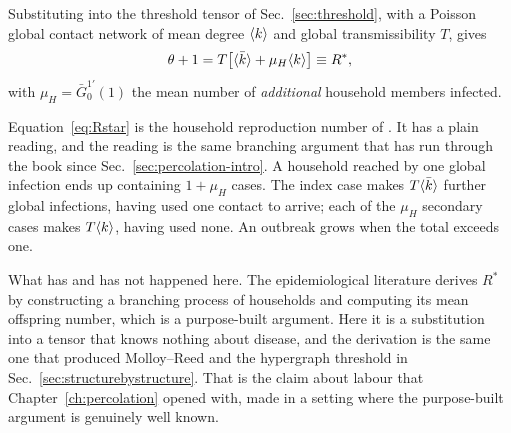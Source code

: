 Substituting into the threshold tensor of Sec.~\ref{sec:threshold}, with a
Poisson global contact network of mean degree $\langle k \rangle$ and global
transmissibility $T$, gives
\begin{equation}
  \theta+1=T\bigl[\langle \bar k \rangle+\mu_{H}\langle k \rangle\bigr]\equiv R^{\ast},
  \label{eq:Rstar}
\end{equation}
with $\mu_{H}=\bar G^{1\prime}_{0}(1)$ the mean number of \emph{additional}
household members infected.

Equation~\eqref{eq:Rstar} is the household reproduction number of
\citet{ball1997}. It has a plain reading, and the reading is the same
branching argument that has run through the book since
Sec.~\ref{sec:percolation-intro}. A household reached by one global infection
ends up containing $1+\mu_{H}$ cases. The index case makes $T\langle \bar k \rangle$
further global infections, having used one contact to arrive; each of the
$\mu_{H}$ secondary cases makes $T\langle k \rangle$, having used none. An outbreak grows
when the total exceeds one.

What has and has not happened here. The epidemiological literature derives $R^{\ast}$ by constructing a branching
process of households and computing its mean offspring number, which is a
purpose-built argument. Here it is a substitution into a tensor that knows
nothing about disease, and the derivation is the same one that produced
Molloy--Reed and the hypergraph threshold in
Sec.~\ref{sec:structurebystructure}. That is the claim about labour that
Chapter~\ref{ch:percolation} opened with, made in a setting where the
purpose-built argument is genuinely well known.

